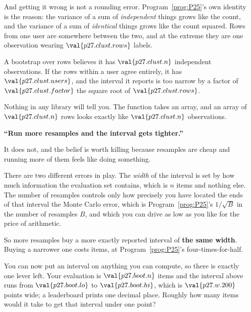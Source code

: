 \begin{fr}

And getting it wrong is not a rounding error. Program~\ref{prog:P25}'s own
identity is the reason: the variance of a sum of \emph{independent} things
grows like the count, and the variance of a sum of \emph{identical} things
grows like the count squared. Rows from one user are somewhere between the
two, and at the extreme they are one observation wearing
$\val{p27.clust.rows}$ labels.

A bootstrap over rows believes it has $\val{p27.clust.n}$ independent
observations. If the rows within a user agree entirely, it has
$\val{p27.clust.users}$, and the interval it reports is too narrow by a
factor of $\val{p27.clust.factor}$ \dash{} the square root of
$\val{p27.clust.rows}$.


Nothing in any library will tell you. The function takes an array, and an
array of $\val{p27.clust.n}$ rows looks exactly like $\val{p27.clust.n}$
observations.
\end{fr}

\begin{fr}
\begin{trapbox}
\textbf{\enquote{Run more resamples and the interval gets tighter.}}

It does not, and the belief is worth killing because resamples are cheap and
running more of them feels like doing something.

There are two different errors in play. The \emph{width} of the interval is
set by how much information the evaluation set contains, which is $n$ items
and nothing else. The number of resamples controls only how precisely you
have located the ends of that interval \dash{} the Monte Carlo error, which
is Program~\ref{prog:P25}'s $1/\sqrt{B}$ in the number of resamples $B$, and
which you can drive as low as you like for the price of arithmetic.

So more resamples buy a more exactly reported interval of \textbf{the same
width}. Buying a narrower one costs items, at
Program~\ref{prog:P25}'s four-times-for-half.
\end{trapbox}

You can now put an interval on anything you can compute, so there is exactly
one lever left. Your evaluation is $\val{p27.boot.n}$ items and the interval
above runs from $\val{p27.boot.lo}$ to $\val{p27.boot.hi}$, which is
$\val{p27.w.200}$ points wide; a leaderboard prints one decimal place.
Roughly how many items would it take to get that interval under one point?
\dotline
\nextframe
\end{fr}


